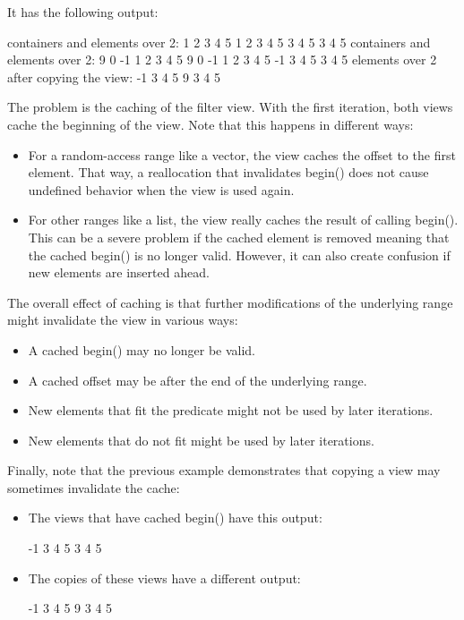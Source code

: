 It has the following output:

\begin{shell}
containers and elements over 2:
1 2 3 4 5
1 2 3 4 5
3 4 5
3 4 5
containers and elements over 2:
9 0 -1 1 2 3 4 5
9 0 -1 1 2 3 4 5
-1 3 4 5
3 4 5
elements over 2 after copying the view:
-1 3 4 5
9 3 4 5
\end{shell}

The problem is the caching of the filter view. With the first iteration, both views cache the beginning of the view. Note that this happens in different ways:

\begin{itemize}
\item
For a random-access range like a vector, the view caches the offset to the first element. That way, a reallocation that invalidates begin() does not cause undefined behavior when the view is used again.

\item
For other ranges like a list, the view really caches the result of calling begin(). This can be a severe problem if the cached element is removed meaning that the cached begin() is no longer valid. However, it can also create confusion if new elements are inserted ahead.
\end{itemize}

The overall effect of caching is that further modifications of the underlying range might invalidate the view in various ways:

\begin{itemize}
\item
A cached begin() may no longer be valid.

\item
A cached offset may be after the end of the underlying range.

\item
New elements that fit the predicate might not be used by later iterations.

\item
New elements that do not fit might be used by later iterations.
\end{itemize}


Finally, note that the previous example demonstrates that copying a view may sometimes invalidate the cache:

\begin{itemize}
\item
The views that have cached begin() have this output:

\begin{shell}
-1 3 4 5
3 4 5
\end{shell}

\item
The copies of these views have a different output:

\begin{shell}
-1 3 4 5
9 3 4 5
\end{shell}

\end{itemize}


